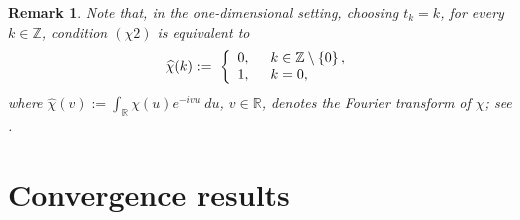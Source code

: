 \documentclass[11pt,a4paper]{article}
\newcommand{\R}{\mathbb{R}}
\newcommand{\Z}{\mathbb{Z}}
\newtheorem{remark}[definition]{Remark}
\begin{document}
\begin{remark} \label{remark3} \rm
Note that, in the one-dimensional setting, choosing $t_{k}=k$, for every $k \in \Z$, condition $(\chi 2)$ is equivalent to 
\begin{displaymath}
\widehat{\chi}(k) :=\ \left\{
\begin{array}{l}
0, \hskip0.5cm k \in \Z\setminus \left\{0\right\}, \\
1, \hskip0.5cm k=0,
\end{array}
\right.
\end{displaymath}
where $\widehat{\chi}(v):=\int_{\R}\chi(u)e^{-ivu}\ du$, $v \in \R$, denotes the Fourier transform of $\chi$; see \cite{BUNE,BABUSTVI,COVI,COVI3}.
\end{remark}




\section{Convergence results}
\end{document}
